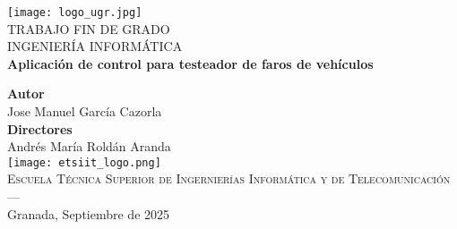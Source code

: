 \begin{titlepage}
    \newlength{\centeroffset}
    \setlength{\centeroffset}{-0.5\oddsidemargin}
    \addtolength{\centeroffset}{0.5\evensidemargin}
    \thispagestyle{empty}

    \noindent\hspace*{\centeroffset}

    \begin{minipage}{\textwidth}
        \centering

        \texttt{[image: logo\_ugr.jpg]}\\[1.4cm]

        \textsc{\Large TRABAJO FIN DE GRADO\\[0.2cm]}
        \textsc{INGENIERÍA INFORMÁTICA}\\[1cm]

        \Huge\bfseries Aplicación de control para testeador de faros de vehículos
    \end{minipage}

    \vspace{2.5cm}
    \noindent\hspace*{\centeroffset}

    \begin{minipage}{\textwidth}
        \centering

        \textbf{Autor}\\{Jose Manuel García Cazorla}\\[2.5ex]
        \textbf{Directores}\\{Andrés María Roldán Aranda}\\[2.5ex]

        \texttt{[image: etsiit\_logo.png]}\\[0.1cm]

        \textsc{Escuela Técnica Superior de Ingernierías Informática y de Telecomunicación}\\
        \textsc{---}\\
        Granada, Septiembre de 2025
    \end{minipage}
\end{titlepage}
